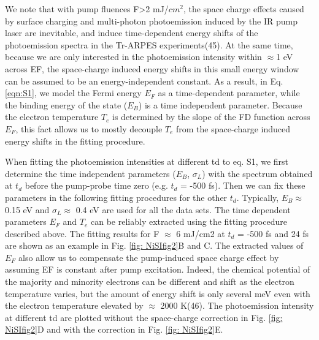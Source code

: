 We note that with pump fluences F>2 mJ/$cm^2$, the space charge effects caused by surface charging and multi-photon photoemission induced by the IR pump laser are inevitable, and induce time-dependent energy shifts of the photoemission spectra in the Tr-ARPES experiments(45). At the same time, because we are only interested in the photoemission intensity within $\approx$1 eV across EF, the space-charge induced energy shifts in this small energy window can be assumed to be an energy-independent constant. As a result, in Eq. \ref{eqn:S1}, we model the Fermi energy $E_F$ as a time-dependent parameter, while the binding energy of the state ($E_B$) is a time independent parameter. Because the electron temperature $T_e$ is determined by the slope of the FD function across $E_F$, this fact allows us to mostly decouple $T_e$ from the space-charge induced energy shifts in the fitting procedure.

When fitting the photoemission intensities at different td to eq. S1, we first determine the time independent parameters ($E_B$, $\sigma_L$) with the spectrum obtained at $t_d$ before the pump-probe time zero (e.g. $t_d$ = -500 fs). Then we can fix these parameters in the following fitting procedures for the other $t_d$. Typically, $E_B \approx$ 0.15 eV and $\sigma_L \approx$ 0.4 eV are used for all the data sets. The time dependent parameters $E_F$ and $T_e$ can be reliably extracted using the fitting procedure described above. The fitting results for F $\approx$ 6 mJ/cm2 at $t_d$ = -500 fs and 24 fs are shown as an example in Fig. \ref{fig: NiSIfig2}B and C. The extracted values of $E_F$ also allow us to compensate the pump-induced space charge effect by assuming EF is constant after pump excitation. Indeed, the chemical potential of the majority and minority electrons can be different and shift as the electron temperature varies, but the amount of energy shift is only several meV even with the electron temperature elevated by $\approx$ 2000 K(46). The photoemission intensity at different td are plotted without the space-charge correction in Fig. \ref{fig: NiSIfig2}D and with the correction in Fig. \ref{fig: NiSIfig2}E.

